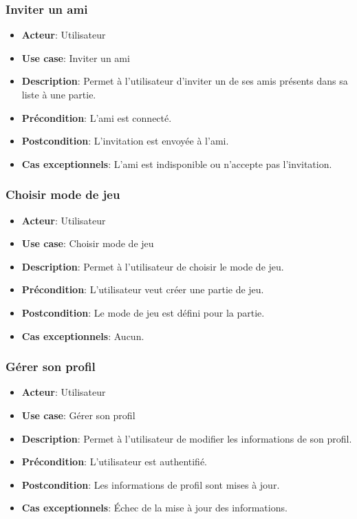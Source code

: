 \documentclass{article}
\begin{document}
\subsubsection*{Inviter un ami}
\begin{itemize}
    \item \textbf{Acteur}: Utilisateur
    \item \textbf{Use case}: Inviter un ami
    \item \textbf{Description}: Permet à l'utilisateur d'inviter un de ses amis présents dans sa liste à une partie.
    \item \textbf{Précondition}: L'ami est connecté.
    \item \textbf{Postcondition}: L'invitation est envoyée à l'ami.
    \item \textbf{Cas exceptionnels}: L'ami est indisponible ou n'accepte pas l'invitation.
\end{itemize}

\subsubsection*{Choisir mode de jeu}
\begin{itemize}
    \item \textbf{Acteur}: Utilisateur
    \item \textbf{Use case}: Choisir mode de jeu
    \item \textbf{Description}: Permet à l'utilisateur de choisir le mode de jeu.
    \item \textbf{Précondition}: L'utilisateur veut créer une partie de jeu.
    \item \textbf{Postcondition}: Le mode de jeu est défini pour la partie.
    \item \textbf{Cas exceptionnels}: Aucun.
\end{itemize}

\subsubsection*{Gérer son profil}
\begin{itemize}
    \item \textbf{Acteur}: Utilisateur
    \item \textbf{Use case}: Gérer son profil
    \item \textbf{Description}: Permet à l'utilisateur de modifier les informations de son profil.
    \item \textbf{Précondition}: L'utilisateur est authentifié.
    \item \textbf{Postcondition}: Les informations de profil sont mises à jour.
    \item \textbf{Cas exceptionnels}: Échec de la mise à jour des informations.
\end{itemize}
\end{document}
